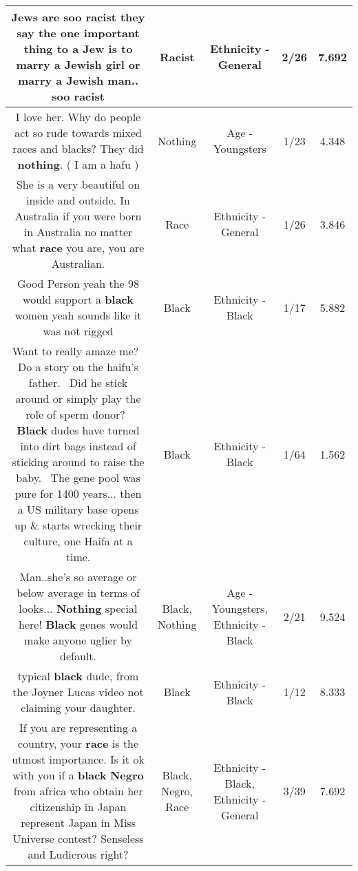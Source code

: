 \documentclass[11pt]{article}
\newlength\mylength
\begin{document}
\begin{center}
\begin{longtable}{|C{.65\mylength}|C{.30\mylength}|C{.12\mylength}|C{.12\mylength}|C{.12\mylength}|}
  \small Jews are soo \textbf{racist} they say the one important thing to a Jew is to marry a Jewish girl or marry a Jewish man.. soo racist\normalsize   & Racist & Ethnicity - General & 2/26 & 7.692 \\  \hline
  \small I love her. Why do people act so rude towards mixed races and blacks? They did \textbf{nothing}. ( I am a hafu )\normalsize   & Nothing & Age - Youngsters & 1/23 & 4.348 \\  \hline
  \small She is a very beautiful on inside and outside.  In Australia if you were born in Australia no matter what \textbf{race} you are, you are Australian.\normalsize   & Race & Ethnicity - General & 1/26 & 3.846 \\  \hline
  \small Good Person yeah the 98 would support a \textbf{black} women yeah sounds like it was not rigged\normalsize   & Black & Ethnicity - Black & 1/17 & 5.882 \\  \hline
  \small Want to really amaze me?  Do a story on the haifu's father.  Did he stick around or simply play the role of sperm donor?  \textbf{Black} dudes have turned into dirt bags instead of sticking around to raise the baby.  The gene pool was pure for 1400 years... then a US military base opens up \& starts wrecking their culture, one Haifa at a time.\normalsize   & Black & Ethnicity - Black & 1/64 & 1.562 \\  \hline
  \small Man..she's so average or below average in terms of looks... \textbf{Nothing} special here! \textbf{Black} genes would make anyone uglier by default.\normalsize   & Black, Nothing & Age - Youngsters, Ethnicity - Black & 2/21 & 9.524 \\  \hline
  \small typical \textbf{black} dude, from the Joyner Lucas video not claiming your daughter.\normalsize   & Black & Ethnicity - Black & 1/12 & 8.333 \\  \hline
  \small If you are representing a country, your \textbf{race} is the utmost importance. Is it ok with you if a \textbf{black} \textbf{Negro} from africa who obtain her citizenship in Japan represent Japan in Miss Universe contest? Senseless and Ludicrous right?\normalsize   & Black, Negro, Race & Ethnicity - Black, Ethnicity - General & 3/39 & 7.692 \\  \hline

\end{longtable}
\end{center}
\end{document}
